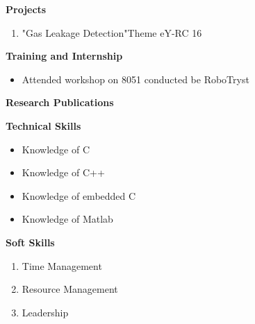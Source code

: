 \documentclass{article}
\begin{document}
\begin{flushleft}
\textbf{Projects }
\begin{flushright}
\begin{enumerate}
\item "Gas Leakage Detection"Theme eY-RC 16
\end{enumerate} 
\end{flushright}
\end{flushleft}



\begin{flushleft}
\textbf{Training and Internship}
\begin{flushright}
\begin{itemize}
\item Attended workshop on 8051 conducted be RoboTryst
\end{itemize} 
\end{flushright}
\end{flushleft}


\begin{flushleft}
\textbf{Research Publications }
\end{flushleft}



\begin{flushleft}
\textbf{Technical Skills}
\begin{flushright}
\begin{itemize}
\item Knowledge of C
\item Knowledge of C++
\item Knowledge of embedded C
\item Knowledge of Matlab
\end{itemize} 
\end{flushright}
\end{flushleft}




\begin{flushleft}
\textbf{Soft Skills }
\begin{flushright}
\begin{enumerate}
\item Time Management
\item Resource Management
\item Leadership
\end{enumerate} 
\end{flushright}
\end{flushleft}
\end{document}
